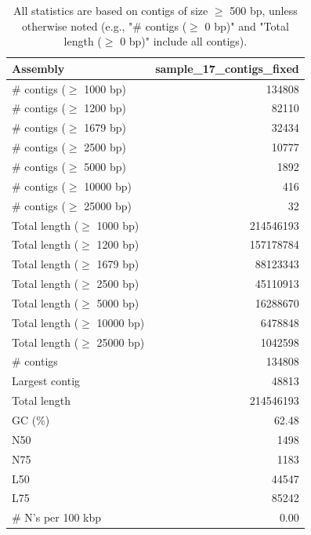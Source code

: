 \documentclass[12pt,a4paper]{article}
\begin{document}
\begin{table}[ht]
\begin{center}
\caption{All statistics are based on contigs of size $\geq$ 500 bp, unless otherwise noted (e.g., "\# contigs ($\geq$ 0 bp)" and "Total length ($\geq$ 0 bp)" include all contigs).}
\begin{tabular}{|l*{1}{|r}|}
\hline
Assembly & sample\_17\_contigs\_fixed \\ \hline
\# contigs ($\geq$ 1000 bp) & 134808 \\ \hline
\# contigs ($\geq$ 1200 bp) & 82110 \\ \hline
\# contigs ($\geq$ 1679 bp) & 32434 \\ \hline
\# contigs ($\geq$ 2500 bp) & 10777 \\ \hline
\# contigs ($\geq$ 5000 bp) & 1892 \\ \hline
\# contigs ($\geq$ 10000 bp) & 416 \\ \hline
\# contigs ($\geq$ 25000 bp) & 32 \\ \hline
Total length ($\geq$ 1000 bp) & 214546193 \\ \hline
Total length ($\geq$ 1200 bp) & 157178784 \\ \hline
Total length ($\geq$ 1679 bp) & 88123343 \\ \hline
Total length ($\geq$ 2500 bp) & 45110913 \\ \hline
Total length ($\geq$ 5000 bp) & 16288670 \\ \hline
Total length ($\geq$ 10000 bp) & 6478848 \\ \hline
Total length ($\geq$ 25000 bp) & 1042598 \\ \hline
\# contigs & 134808 \\ \hline
Largest contig & 48813 \\ \hline
Total length & 214546193 \\ \hline
GC (\%) & 62.48 \\ \hline
N50 & 1498 \\ \hline
N75 & 1183 \\ \hline
L50 & 44547 \\ \hline
L75 & 85242 \\ \hline
\# N's per 100 kbp & 0.00 \\ \hline
\end{tabular}
\end{center}
\end{table}
\end{document}
